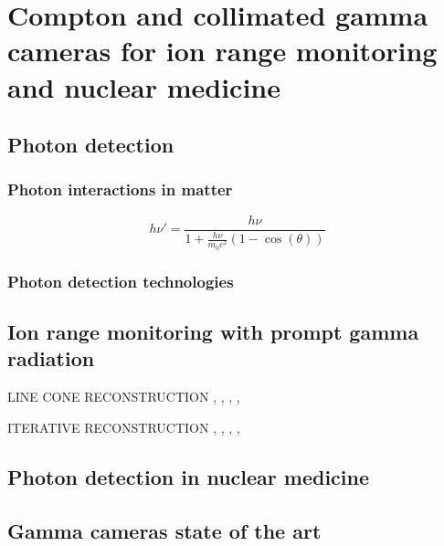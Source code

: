 \chapter{Compton and collimated gamma cameras for ion range monitoring and nuclear medicine}\label{chap::2}

\vfill

\minitoc

\newpage

\glsresetall

\section{Photon detection}

\subsection{Photon interactions in matter}

\begin{equation}
h\nu' = \frac{h\nu}{1+\frac{h\nu}{m_{0}c^2}(1-\cos(\theta))}
\label{chap2::eq::Compton}
\end{equation} 

\subsection{Photon detection technologies}


\section{Ion range monitoring with prompt gamma radiation}

LINE CONE RECONSTRUCTION \parencite{Cree1994}, \parencite{Basko1998}, \parencite{Parra1999}, \parencite{Hirasawa2003}, \parencite{Maxim2009} 

ITERATIVE RECONSTRUCTION \parencite{Schone2010}, \parencite{Zoglauer2011}, \parencite{Gillam2011}, \parencite{Lojacono2013}, \parencite{Mackin2012}

\section{Photon detection in nuclear medicine}

\section{Gamma cameras state of the art}

\clearpage
